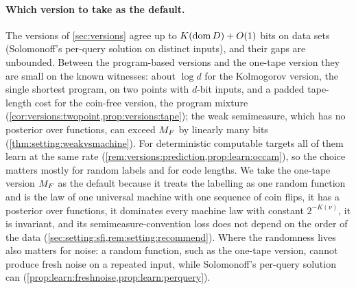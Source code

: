 \paragraph{Which version to take as the default.} The versions of \cref{sec:versions} agree up to $K(\operatorname{dom} D)+O(1)$ bits on data sets (Solomonoff's per-query solution on distinct inputs), and their gaps are unbounded. Between the program-based versions and the one-tape version they are small on the known witnesses: about $\log d$ for the Kolmogorov version, the single shortest program, on two points with $d$-bit inputs, and a padded tape-length cost for the coin-free version, the program mixture (\cref{cor:versions:twopoint,prop:versions:tape}); the weak semimeasure, which has no posterior over functions, can exceed $M_{F}$ by linearly many bits (\cref{thm:setting:weakvsmachine}). For deterministic computable targets all of them learn at the same rate (\cref{rem:versions:prediction,prop:learn:occam}), so the choice matters mostly for random labels and for code lengths. We take the one-tape version $M_{F}$ as the default because it treats the labelling as one random function and is the law of one universal machine with one sequence of coin flips, it has a posterior over functions, it dominates every machine law with constant $2^{-K(\nu)}$, it is invariant, and its semimeasure-convention loss does not depend on the order of the data (\cref{sec:setting:sfi,rem:setting:recommend}). Where the randomness lives also matters for noise: a random function, such as the one-tape version, cannot produce fresh noise on a repeated input, while Solomonoff's per-query solution can (\cref{prop:learn:freshnoise,prop:learn:perquery}).


